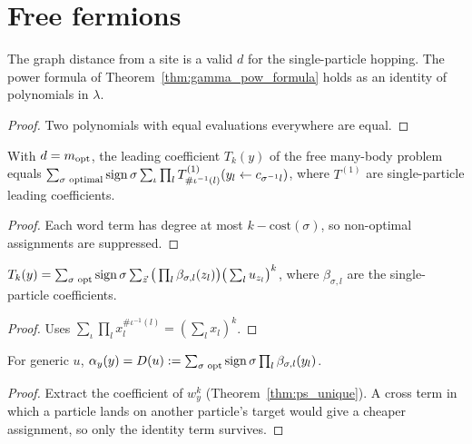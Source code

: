 \section{Free fermions}

\begin{lemma}
  \label{lem:ff_tools}
  \leanok
  The graph distance from a site is a valid $d$ for the single-particle hopping. The power formula of
  Theorem~\ref{thm:gamma_pow_formula} holds as an identity of polynomials in $\lambda$.
\end{lemma}
\begin{proof}
  \leanok
  Two polynomials with equal evaluations everywhere are equal.
\end{proof}

\begin{theorem}
  \label{thm:T_MB_formula}
  \leanok
  With $d=m_{\mathrm{opt}}$, the leading coefficient $T_k(y)$ of the free many-body problem equals
  $\sum_{\sigma\text{ optimal}}\operatorname{sign}\sigma\sum_\iota\prod_lT^{(1)}_{\#\iota^{-1}(l)}(y_l\leftarrow c_{\sigma^{-1}l})$,
  where $T^{(1)}$ are single-particle leading coefficients.
\end{theorem}
\begin{proof}
  \leanok
  Each word term has degree at most $k-\mathrm{cost}(\sigma)$, so non-optimal assignments are suppressed.
\end{proof}

\begin{theorem}
  \label{thm:T_MB_powersum}
  \leanok
  $T_k(y)=\sum_{\sigma\text{ opt}}\operatorname{sign}\sigma\sum_{\vec z}\big(\prod_l\beta_{\sigma,l}(z_l)\big)\big(\sum_lu_{z_l}\big)^k$,
  where $\beta_{\sigma,l}$ are the single-particle coefficients.
\end{theorem}
\begin{proof}
  \leanok
  Uses $\sum_\iota\prod_lx_l^{\#\iota^{-1}(l)}=(\sum_lx_l)^k$.
\end{proof}

\begin{theorem}
  \label{thm:alpha_eq_D}
  \leanok
  For generic $u$, $\alpha_y(y)=D(u):=\sum_{\sigma\text{ opt}}\operatorname{sign}\sigma\prod_l\beta_{\sigma,l}(y_l)$.
\end{theorem}
\begin{proof}
  \leanok
  Extract the coefficient of $w_y^k$ (Theorem~\ref{thm:ps_unique}). A cross term in which a particle lands
  on another particle's target would give a cheaper assignment, so only the identity term survives.
\end{proof}

